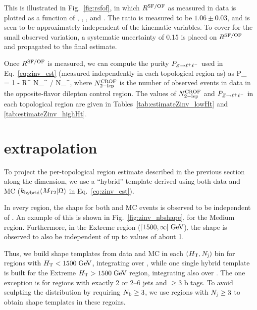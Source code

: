 This is illustrated in Fig.~\ref{fig:rsfof}, in which $R^{\mathrm{SF/OF}}$ as measured in data is plotted
as a function of \Ht, \mttwo, \Nj, and \Nb. The ratio is measured to be $1.06\pm0.03$, and is seen to 
be approximately independent of the kinematic variables. To cover for the small observed variation, 
a systematic uncertainty of 0.15 is placed on $R^{\mathrm{SF/OF}}$ and propagated to the final estimate.

Once $R^{\mathrm{SF/OF}}$ is measured, we can compute the purity $P_{Z\to\ell^+\ell^-}$ used in Eq.~\ref{eq:zinv_est} 
(measured independently in each topological region as) as
\be
P_{\zll} = 1 - R^ N_^ / N_^,
\ee
where $N_{\mathrm{2-lep}}^{\mathrm{CROF}}$ is the number of observed events in data in the opposite-flavor
dilepton control region. The values of $N_{\mathrm{2-lep}}^{\mathrm{CROF}}$ and $P_{Z\to\ell^+\ell^-}$ in each
topological region are given in Tables~\ref{tab:estimateZinv_lowHt} and \ref{tab:estimateZinv_highHt}.




\section{\texorpdfstring{\mttwo}{MT2} extrapolation}
\label{sec:zinv_mt2}

To project the per-topological region estimate described in the previous section along the \mttwo dimension, we use
a ``hybrid'' \mttwo template derived using both data and MC ($k_{\mathrm{hybrid}}(M_{\mathrm{T2}}|\Omega)$ in Eq.~\ref{eq:zinv_est}).

In every \Ht region, the \mttwo shape for both \znunu and \zll MC events is observed to be independent of \Nb.
An example of this is shown in Fig.~\ref{fig:zinv_nbshape}, for the Medium \Ht region. Furthermore,
in the Extreme \Ht region ($[1500,\infty]\;\text{Ge\hspace{-.08em}V}$), the \mttwo shape is observed to also be independent of \Nj
up to \mttwo values of about 1\TeV.

Thus, we build \mttwo shape templates from data and MC in each $(H_{\mathrm{T}},N_{\mathrm{j}})$ bin for regions
with $H_{\mathrm{T}}<1500\;\text{Ge\hspace{-.08em}V}$, integrating over \Nb, while one single hybrid template is built for the
Extreme $H_{\mathrm{T}}>1500\;\text{Ge\hspace{-.08em}V}$ region, integrating also over \Nj. The one exception is for regions with
exactly 2 or 2--6 jets and $\geq$3 b tags. To avoid sculpting the \Nj distribution by requiring
$N_{\mathrm{b}}\geq3$, we use regions with $N_{\mathrm{j}}\geq3$ to obtain \mttwo shape templates in these regoins.

